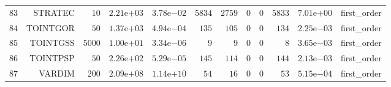 \begin{longtable}{rrrrrrrrrrrr}
  \(    83\) & STRATEC & \(    10\) & \( 2.21\)e\(+03\) & \( 3.78\)e\(-02\) & \(  5834\) & \(  2759\) & \(     0\) & \(     0\) & \(  5833\) & \( 7.01\)e\(+00\) & first\_order \\
  \(    84\) & TOINTGOR & \(    50\) & \( 1.37\)e\(+03\) & \( 4.94\)e\(-04\) & \(   135\) & \(   105\) & \(     0\) & \(     0\) & \(   134\) & \( 2.25\)e\(-03\) & first\_order \\
  \(    85\) & TOINTGSS & \(  5000\) & \( 1.00\)e\(+01\) & \( 3.34\)e\(-06\) & \(     9\) & \(     9\) & \(     0\) & \(     0\) & \(     8\) & \( 3.65\)e\(-03\) & first\_order \\
  \(    86\) & TOINTPSP & \(    50\) & \( 2.26\)e\(+02\) & \( 5.29\)e\(-05\) & \(   145\) & \(   114\) & \(     0\) & \(     0\) & \(   144\) & \( 2.13\)e\(-03\) & first\_order \\
  \(    87\) & VARDIM & \(   200\) & \( 2.09\)e\(+08\) & \( 1.14\)e\(+10\) & \(    54\) & \(    16\) & \(     0\) & \(     0\) & \(    53\) & \( 5.15\)e\(-04\) & first\_order \\\hline
\end{longtable}
